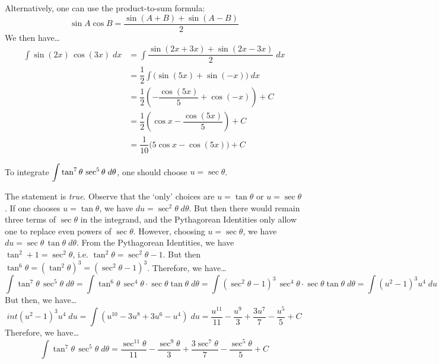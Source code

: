 \documentclass[11pt,letterpaper]{article}
\begin{document}
Alternatively, one can use the product-to-sum formula:
	\[
	\sin A \cos B = \dfrac{\sin(A + B) + \sin(A - B)}{2}
	\]
We then have\dots
	\[
	\begin{aligned}
	\int \sin(2x) \, \cos(3x) \;dx&= \int \dfrac{\sin(2x + 3x) + \sin(2x - 3x)}{2} \;dx \\[0.3cm]
	&= \dfrac{1}{2} \int \big( \sin(5x) + \sin(-x) \big) \;dx \\[0.3cm]
	&= \dfrac{1}{2} \left( -\dfrac{\cos(5x)}{5} + \cos(-x) \right) + C \\[0.3cm]
	&= \dfrac{1}{2} \left( \cos x -\dfrac{\cos(5x)}{5} \right) + C \\[0.3cm]
	&= \dfrac{1}{10} \big( 5 \cos x - \cos(5x) \big) + C
	\end{aligned}
	\]





\newpage





 To integrate $\displaystyle\int \tan^7 \theta \, \sec^5 \theta \;d\theta$, one should choose $u= \sec \theta$. \pspace

\sol The statement is \textit{true}. Observe that the `only' choices are $u= \tan \theta$ or $u= \sec \theta$. If one chooses $u= \tan \theta$, we have $du= \sec^2 \theta \;d\theta$. But then there would remain three terms of $\sec \theta$ in the integrand, and the Pythagorean Identities only allow one to replace even powers of $\sec \theta$. However, choosing $u= \sec \theta$, we have $du= \sec \theta \, \tan \theta \;d\theta$. From the Pythagorean Identities, we have $\tan^2 + 1= \sec^2 \theta$, i.e. $\tan^2 \theta= \sec^2 \theta - 1$. But then $\tan^6 \theta= (\tan^2 \theta)^3= (\sec^2 \theta - 1)^3$. Therefore, we have\dots
	\[
	\int \tan^7 \theta \, \sec^5 \theta \;d\theta= \int \tan^6 \theta \, \sec^4 \theta \cdot \sec \theta \tan \theta \;d\theta= \int (\sec^2 \theta - 1)^3 \, \sec^4 \theta \cdot \sec \theta \tan \theta \;d\theta= \int (u^2 - 1)^3 u^4 \;du
	\]
But then, we have\dots
	\[
	int (u^2 - 1)^3 u^4 \;du= \int (u^{10} - 3u^8 + 3u^6 - u^4) \;du= \dfrac{u^{11}}{11} - \dfrac{u^9}{3} + \dfrac{3u^7}{7} - \dfrac{u^5}{5} + C
	\]
Therefore, we have\dots
	\[
	\int \tan^7 \theta \, \sec^5 \theta \;d\theta= \dfrac{\sec^{11} \theta}{11} - \dfrac{\sec^9 \theta}{3} + \dfrac{3\sec^7 \theta}{7} - \dfrac{\sec^5 \theta}{5} + C
	\] \par\vspace{1.3cm}
\end{document}
